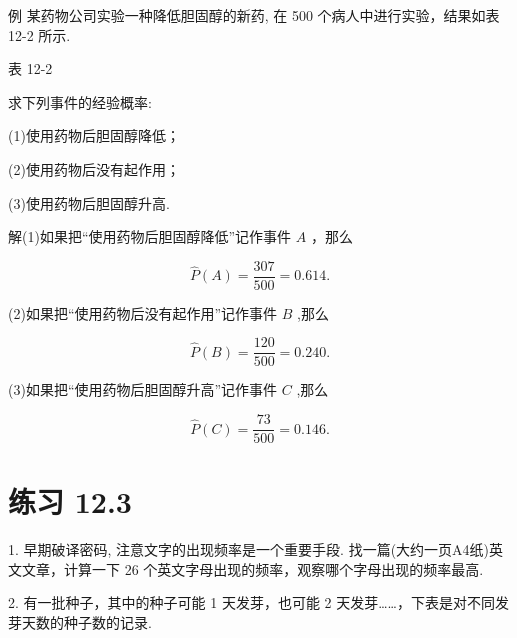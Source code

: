 \documentclass[10pt]{article}
\begin{document}
例 某药物公司实验一种降低胆固醇的新药, 在 500 个病人中进行实验，结果如表 12-2 所示.

表 12-2

\begin{center}
\end{center}

求下列事件的经验概率:

(1)使用药物后胆固醇降低；

(2)使用药物后没有起作用；

(3)使用药物后胆固醇升高.

解(1)如果把“使用药物后胆固醇降低”记作事件 \(A\) ，那么

\[
\widehat{P}\left( A\right)  = \frac{307}{500} = {0.614}.
\]

(2)如果把“使用药物后没有起作用”记作事件 \(B\) ,那么

\[
\widehat{P}\left( B\right)  = \frac{120}{500} = {0.240}.
\]

(3)如果把“使用药物后胆固醇升高”记作事件 \(C\) ,那么

\[
\widehat{P}\left( C\right)  = \frac{73}{500} = {0.146}.
\]

\section*{练习 12.3}

1. 早期破译密码, 注意文字的出现频率是一个重要手段. 找一篇(大约一页A4纸)英文文章，计算一下 26 个英文字母出现的频率，观察哪个字母出现的频率最高.

2. 有一批种子，其中的种子可能 1 天发芽，也可能 2 天发芽……，下表是对不同发芽天数的种子数的记录.

\begin{center}
\end{center}
\end{document}
